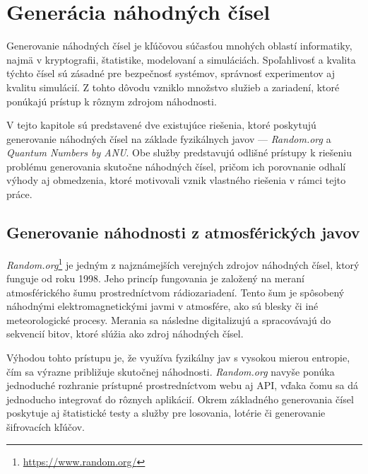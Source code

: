 
\chapter{Generácia náhodných čísel}\label{ch:generacia-nahodnych-cisel}

Generovanie náhodných čísel je kľúčovou súčasťou mnohých oblastí informatiky, najmä v kryptografii, štatistike, modelovaní a simuláciách. Spoľahlivosť a kvalita týchto čísel sú zásadné pre bezpečnosť systémov, správnosť experimentov aj kvalitu simulácií. Z tohto dôvodu vzniklo množstvo služieb a zariadení, ktoré ponúkajú prístup k rôznym zdrojom náhodnosti.

V tejto kapitole sú predstavené dve existujúce riešenia, ktoré poskytujú generovanie náhodných čísel na základe fyzikálnych javov — \textit{Random.org} a \textit{Quantum Numbers by ANU}. Obe služby predstavujú odlišné prístupy k riešeniu problému generovania skutočne náhodných čísel, pričom ich porovnanie odhalí výhody aj obmedzenia, ktoré motivovali vznik vlastného riešenia v rámci tejto práce.

\section{Generovanie náhodnosti z atmosférických javov}\label{sec:nahodne-cisla-na-baze-atmosferickeho-sumu}

\textit{Random.org}\footnote{\url{https://www.random.org/}}\cite{randomorg} je jedným z najznámejších verejných zdrojov náhodných čísel, ktorý funguje od roku 1998. Jeho princíp fungovania je založený na meraní atmosférického šumu prostredníctvom rádiozariadení. Tento šum je spôsobený náhodnými elektromagnetickými javmi v atmosfére, ako sú blesky či iné meteorologické procesy. Merania sa následne digitalizujú a spracovávajú do sekvencií bitov, ktoré slúžia ako zdroj náhodných čísel.

Výhodou tohto prístupu je, že využíva fyzikálny jav s vysokou mierou entropie, čím sa výrazne približuje skutočnej náhodnosti. \textit{Random.org} navyše ponúka jednoduché rozhranie prístupné prostredníctvom webu aj API, vďaka čomu sa dá jednoducho integrovať do rôznych aplikácií. Okrem základného generovania čísel poskytuje aj štatistické testy a služby pre losovania, lotérie či generovanie šifrovacích kľúčov.

